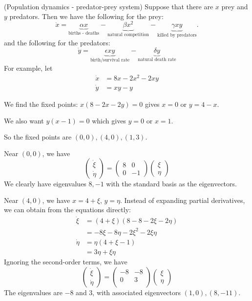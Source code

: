 \documentclass[a4paper]{article}
\begin{document}
\begin{eg}
  (Population dynamics - predator-prey system) Suppose that there are $x$ prey and $y$ predators. Then we have the following for the prey:
\[
\dot x = \underbrace{\alpha x}_{\text{births - deaths}} - \underbrace{\beta x^2}_{\text{natural competition}} - \underbrace{\gamma xy}_{\text{killed by predators}}.
\]
and the following for the predators:
\[
\dot y = \underbrace{\epsilon xy}_{\text{birth/survival rate}} - \underbrace{\delta y}_{\text{natural death rate}}
\]
For example, let
\begin{align*}
  \dot x &= 8x - 2x^2 - 2xy\\
  \dot y &= xy - y
\end{align*}

We find the fixed points: $x(8 - 2x - 2y) = 0$ gives $x = 0$ or $y = 4 - x$.

We also want $y(x - 1) = 0$ which gives $y = 0$ or $x = 1$.

So the fixed points are $(0, 0), (4, 0), (1, 3)$.

Near $(0, 0)$, we have
\[
\begin{pmatrix}
  \dot \xi\\\dot \eta
\end{pmatrix}=
\begin{pmatrix}
  8 & 0\\
  0 & -1
\end{pmatrix}
\begin{pmatrix}
  \xi\\
  \eta
\end{pmatrix}
\]
We clearly have eigenvalues $8, -1$ with the standard basis as the eigenvectors.


Near $(4, 0)$, we have $x = 4 + \xi$, $y = \eta$. Instead of expanding partial derivatives, we can obtain from the equations directly:
\begin{align*}
  \dot\xi &= (4 + \xi)(8 - 8 - 2\xi - 2\eta)\\
  &= - 8\xi - 8\eta -2\xi^2 - 2\xi\eta\\
  \dot\eta &= \eta(4 + \xi - 1)\\
  &= 3\eta + \xi\eta
\end{align*}
Ignoring the second-order terms, we have
\[
\begin{pmatrix}
\dot\xi\\\dot\eta
\end{pmatrix} = 
\begin{pmatrix}
  -8 & -8 \\
  0 & 3\\
\end{pmatrix}
\begin{pmatrix}
  \xi\\\eta
\end{pmatrix}
\]
The eigenvalues are $-8$ and $3$, with associated eigenvectors $(1, 0), (8, -11)$.
\newpage %


\end{eg}
\end{document}
